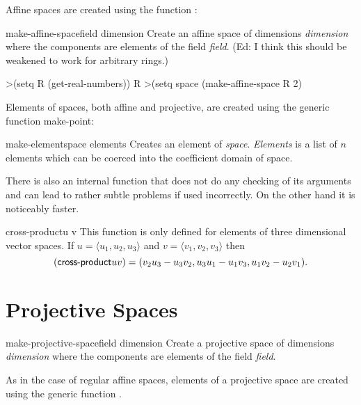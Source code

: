 Affine spaces are created using the function :
  
\begin{functiondef}{make-affine-space}{field dimension}  
Create an affine space of dimensions {\em dimension} where the
components are elements of the field {\em field}. (Ed: I think this
should be weakened to work for arbitrary rings.)
\end{functiondef}

\begin{code}
>(setq R (get-real-numbers))
R
>(setq space (make-affine-space R 2)
\end{code}

Elements of spaces, both affine and projective, are created using the
generic function {\sf make-point}:
  
\begin{functiondef}{make-element}{space \rest elements}  
Creates an element of {\em space}. {\em Elements} is a list of $n$
elements which can be coerced into the coefficient domain of space.
\end{functiondef}
  
There is also an internal function  that
does not do any checking of its arguments and can lead to rather
subtle problems if used incorrectly.  On the other hand it is
noticeably faster.
  
\begin{functiondef}{cross-product}{u v}
This function is only defined for elements of three dimensional vector
spaces. If $u = \langle u_1, u_2, u_3\rangle$ and $v = \langle v_1,
v_2, v_3\rangle$ then
\[
(\mbox{\sf cross-product} u v) =
(v_2 u_3 - u_3 v_2, u_3 u_1 - u_1 v_3, u_1 v_2 - u_2 v_1).
\]
\end{functiondef}

\section{Projective Spaces}
\label{ProjectiveSpaces:Sec}
  
\begin{functiondef}{make-projective-space}{field dimension}
Create a projective space of dimensions {\em dimension} where the
components are elements of the field {\em field}.
\end{functiondef}

  
As in the case of regular affine spaces, elements of a projective
space are created using the generic function .

